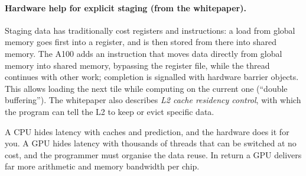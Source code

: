 \paragraph{Hardware help for explicit staging (from the whitepaper).}
Staging data has traditionally cost registers and instructions: a load from global memory goes first into a register, and is then stored from there into shared memory. The A100 adds an  instruction that moves data directly from global memory
into shared memory, bypassing the register file, while the thread continues with other work; completion is signalled with hardware barrier objects. This allows loading the next tile while computing on the current one (``double buffering''). The whitepaper also describes
\emph{L2 cache residency control}, with which the program can tell the L2 to keep or evict specific data.

\begin{keyidea}
A CPU hides latency with caches and prediction, and the hardware does it for you. A GPU hides latency with thousands of threads that can be switched at no cost, and
the programmer must organise the data reuse. In return a GPU delivers far more arithmetic and memory bandwidth per chip.
\end{keyidea}

